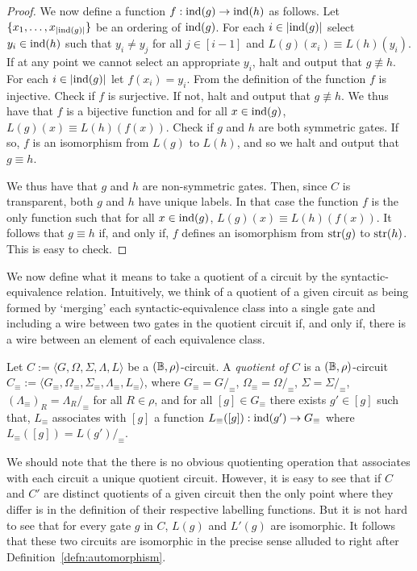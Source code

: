 \documentclass[../paper.tex]{subfiles}
\begin{document}
\begin{proof}
  We now define a function $f: \text{\upshape ind}(g) \rightarrow \text{\upshape ind}(h)$ as follows. Let
  $\{x_1, \ldots, x_{\vert \text{\upshape ind}(g)\vert}\}$ be an ordering of $\text{\upshape ind}(g)$. For
  each $i \in \vert \text{\upshape ind}(g) \vert$ select $y_i \in \text{\upshape ind}(h)$ such that $y_i \neq
  y_j$ for all $j \in [i-1]$ and $L(g)(x_i) \equiv L(h)(y_i)$. If at any point
  we cannot select an appropriate $y_i$, halt and output that $g \not\equiv h$.
  For each $i \in \vert \text{\upshape ind}(g) \vert$ let $f(x_i) = y_i$. From the definition
  of the function $f$ is injective. Check if $f$ is surjective. If not, halt and
  output that $g \not\equiv h$. We thus have that $f$ is a bijective function
  and for all $x \in \text{\upshape ind}(g)$, $L(g)(x) \equiv L(h)(f(x))$. Check if $g$ and $h$
  are both symmetric gates. If so, $f$ is an isomorphism from $L(g)$ to $L(h)$,
  and so we halt and output that $g \equiv h$.

  We thus have that $g$ and $h$ are non-symmetric gates. Then, since $C$ is
  transparent, both $g$ and $h$ have unique labels. In that case the function
  $f$ is the only function such that for all $x \in \text{\upshape ind}(g)$, $L(g)(x) \equiv
  L(h)(f(x))$. It follows that $g \equiv h$ if, and only if, $f$ defines an
  isomorphism from $\text{str}(g)$ to $\text{str}(h)$. This is easy to check.
\end{proof}

We now define what it means to take a quotient of a circuit by the
syntactic-equivalence relation. Intuitively, we think of a quotient of a given
circuit as being formed by `merging' each syntactic-equivalence class into a
single gate and including a wire between two gates in the quotient circuit if,
and only if, there is a wire between an element of each equivalence class.

\begin{definition}
  Let $C := \langle G, \Omega, \Sigma, \Lambda, L \rangle$ be a $(\mathbb{B},
  \rho)$-circuit. A \emph{quotient of $C$} is a $(\mathbb{B}, \rho)$-circuit $C_\equiv
  := \langle G_\equiv , \Omega_\equiv, \Sigma_\equiv , \Lambda_\equiv, L_\equiv
  \rangle$, where $G_\equiv = G /_\equiv$, $\Omega_\equiv = \Omega /_\equiv$,
  $\Sigma = \Sigma /_\equiv$, $(\Lambda_\equiv)_R = \Lambda_R /_\equiv$ for all
  $R \in \rho$, and for all $[g] \in G_\equiv$ there exists $g' \in [g]$ such
  that, $L_\equiv$ associates with $[g]$ a function $L_\equiv([g]) : \text{\upshape ind}(g')
  \rightarrow G_\equiv$ where $L_\equiv([g]) = L(g')/_\equiv$.
\end{definition}

We should note that the there is no obvious quotienting operation that
associates with each circuit a unique quotient circuit. However, it is easy to
see that if $C$ and $C'$ are distinct quotients of a given circuit then the only
point where they differ is in the definition of their respective labelling
functions. But it is not hard to see that for every gate $g$ in $C$, $L(g)$ and
$L'(g)$ are isomorphic. It follows that these two circuits are isomorphic in the
precise sense alluded to right after Definition~\ref{defn:automorphism}.
\end{document}
